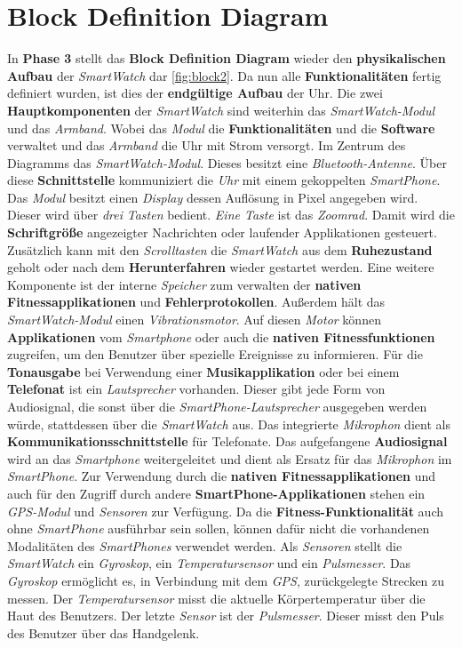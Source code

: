 \section{Block Definition Diagram}
In \textbf{Phase 3} stellt das \textbf{Block Definition Diagram} wieder den \textbf{physikalischen Aufbau} der \textit{SmartWatch} dar \ref{fig:block2}. Da nun alle \textbf{Funktionalitäten} fertig definiert wurden, ist dies der \textbf{endgültige Aufbau} der Uhr. Die zwei \textbf{Hauptkomponenten} der \textit{SmartWatch} sind weiterhin das \textit{SmartWatch-Modul} und das \textit{Armband}. Wobei das \textit{Modul} die \textbf{Funktionalitäten} und die \textbf{Software} verwaltet und das \textit{Armband} die Uhr mit Strom versorgt. Im Zentrum des Diagramms das \textit{SmartWatch-Modul}. Dieses besitzt eine \textit{Bluetooth-Antenne}. Über diese \textbf{Schnittstelle} kommuniziert die \textit{Uhr} mit einem gekoppelten \textit{SmartPhone}. Das \textit{Modul} besitzt einen \textit{Display} dessen Auflösung in Pixel angegeben wird. Dieser wird über \textit{drei} \textit{Tasten} bedient. \textit{Eine Taste} ist das \textit{Zoomrad}. Damit wird die \textbf{Schriftgröße} angezeigter Nachrichten oder laufender Applikationen gesteuert. Zusätzlich kann mit den \textit{Scrolltasten} die \textit{SmartWatch} aus dem \textbf{Ruhezustand} geholt oder nach dem \textbf{Herunterfahren} wieder gestartet werden. Eine weitere Komponente ist der interne \textit{Speicher} zum verwalten der \textbf{nativen Fitnessapplikationen} und \textbf{Fehlerprotokollen}. Außerdem hält das \textit{SmartWatch-Modul} einen \textit{Vibrationsmotor}. Auf diesen \textit{Motor} können \textbf{Applikationen} vom \textit{Smartphone} oder auch die \textbf{nativen Fitnessfunktionen} zugreifen, um den Benutzer über spezielle Ereignisse zu informieren. Für die \textbf{Tonausgabe} bei Verwendung einer \textbf{Musikapplikation} oder bei einem \textbf{Telefonat} ist ein \textit{Lautsprecher} vorhanden. Dieser gibt jede Form von Audiosignal, die sonst über die \textit{SmartPhone-Lautsprecher} ausgegeben werden würde, stattdessen über die \textit{SmartWatch} aus. Das integrierte \textit{Mikrophon} dient als \textbf{Kommunikationsschnittstelle} für Telefonate. Das aufgefangene \textbf{Audiosignal} wird an das \textit{Smartphone} weitergeleitet und dient als Ersatz für das \textit{Mikrophon} im \textit{SmartPhone}. Zur Verwendung durch die \textbf{nativen Fitnessapplikationen} und auch für den Zugriff durch andere \textbf{SmartPhone-Applikationen} stehen ein \textit{GPS-Modul} und \textit{Sensoren} zur Verfügung. Da die \textbf{Fitness-Funktionalität} auch ohne \textit{SmartPhone} ausführbar sein sollen, können dafür nicht die vorhandenen Modalitäten des \textit{SmartPhones} verwendet werden. Als \textit{Sensoren} stellt die \textit{SmartWatch} ein \textit{Gyroskop}, ein \textit{Temperatursensor} und ein \textit{Pulsmesser}. Das \textit{Gyroskop} ermöglicht es, in Verbindung mit dem \textit{GPS}, zurückgelegte Strecken zu messen. Der \textit{Temperatursensor} misst die aktuelle Körpertemperatur über die Haut des Benutzers. Der letzte \textit{Sensor} ist der \textit{Pulsmesser}. Dieser misst den Puls des Benutzer über das Handgelenk.\\
